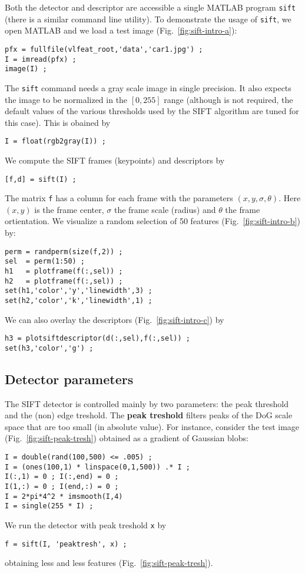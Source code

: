 \documentclass{article}
\begin{document}
Both the detector and descriptor are accessible a single MATLAB
program \verb$sift$ (there is a similar command line utility). To
demonstrate the usage of \verb$sift$, we open MATLAB and we load a
test image (Fig.~\ref{fig:sift-intro-a}):
\begin{verbatim}
pfx = fullfile(vlfeat_root,'data','car1.jpg') ;
I = imread(pfx) ;
image(I) ;
\end{verbatim}
The \verb$sift$ command needs a gray scale image in single
precision. It also expects the image to be normalized in the $[0,255]$
range (although is not required, the default values of the various
thresholds used by the SIFT algorithm are tuned for this case). This
is obained by
\begin{verbatim}
I = float(rgb2gray(I)) ;
\end{verbatim}
We compute the SIFT frames (keypoints) and descriptors by
\begin{verbatim}
[f,d] = sift(I) ;
\end{verbatim}
The matrix \verb$f$ has a column for each frame with the parameters
$(x,y,\sigma,\theta)$. Here $(x,y)$ is the frame center, $\sigma$ the
frame scale (radius) and $\theta$ the frame ortientation. We visualize
a random selection of 50 features (Fig.~\ref{fig:sift-intro-b}) by:
\begin{verbatim}
perm = randperm(size(f,2)) ; 
sel  = perm(1:50) ;
h1   = plotframe(f(:,sel)) ; 
h2   = plotframe(f(:,sel)) ; 
set(h1,'color','y','linewidth',3) ;
set(h2,'color','k','linewidth',1) ;
\end{verbatim}
We can also overlay the descriptors (Fig.~\ref{fig:sift-intro-c}) by
\begin{verbatim}
h3 = plotsiftdescriptor(d(:,sel),f(:,sel)) ;  
set(h3,'color','g') ;
\end{verbatim}

\subsection{Detector parameters}\label{sift.parameters}

The SIFT detector is controlled mainly by two parameters: the peak
threshold and the (non) edge treshold. The {\bf peak treshold} filters
peaks of the DoG scale space that are too small (in absolute
value). For instance, consider the test image
(Fig.~\ref{fig:sift-peak-tresh}) obtained as a gradient of Gaussian
blobs:
\begin{verbatim}
I = double(rand(100,500) <= .005) ;
I = (ones(100,1) * linspace(0,1,500)) .* I ;
I(:,1) = 0 ; I(:,end) = 0 ;
I(1,:) = 0 ; I(end,:) = 0 ;
I = 2*pi*4^2 * imsmooth(I,4)
I = single(255 * I) ;
\end{verbatim}
We run the detector with peak treshold \verb$x$ by
\begin{verbatim}
f = sift(I, 'peaktresh', x) ;
\end{verbatim}
obtaining less and less features (Fig.~\ref{fig:sift-peak-tresh}).
\end{document}
